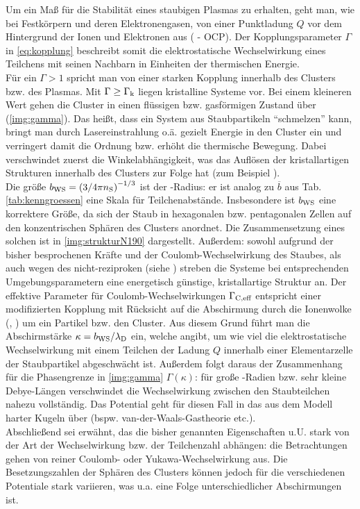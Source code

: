          Um ein Maß für die Stabilität eines staubigen Plasmas zu erhalten, geht man, wie bei Festkörpern und deren Elektronengasen, von einer Punktladung $Q$ vor dem Hintergrund der Ionen und Elektronen aus ( - OCP). Der Kopplungsparameter $\Gamma$ in \autoref{eq:kopplung} beschreibt somit die elektrostatische Wechselwirkung eines Teilchens mit seinen Nachbarn in Einheiten der thermischen Energie.\\
        Für ein $\Gamma>1$ spricht man von einer starken Kopplung innerhalb des Clusters bzw. des Plasmas. Mit $\Gamma\geq\Gamma_\text{k}$ liegen kristalline Systeme vor. Bei einem kleineren Wert gehen die Cluster in einen flüssigen bzw. gasförmigen Zustand über (\autoref{img:gamma}). Das heißt, dass ein System aus Staubpartikeln "`schmelzen"' kann, bringt man durch Lasereinstrahlung o.ä. gezielt Energie in den Cluster ein und verringert damit die Ordnung bzw. erhöht die thermische Bewegung. Dabei verschwindet zuerst die Winkelabhängigkeit, was das Auflösen der kristallartigen Strukturen innerhalb des Clusters zur Folge hat (zum Beispiel \cite{Thomas96}).\\
        Die größe $b_\text{WS}=\left(3/4\pi n_\text{S}\right)^{-1/3}$ ist der -Radius: er ist analog zu $\overline{b}$ aus Tab. \ref{tab:kenngroessen} eine Skala für Teilchenabstände. Insbesondere ist $b_\text{WS}$ eine korrektere Größe, da sich der Staub in hexagonalen bzw. pentagonalen Zellen auf den konzentrischen Sphären des Clusters anordnet. Die Zusammensetzung eines solchen  ist in \autoref{img:strukturN190} dargestellt. Außerdem: sowohl aufgrund der bisher besprochenen Kräfte und der Coulomb-Wechselwirkung des Staubes, als auch wegen des nicht-reziproken  (siehe \cite{Melzer95c}) streben die Systeme bei entsprechenden Umgebungsparametern eine energetisch günstige, kristallartige Struktur an.  Der effektive Parameter für Coulomb-Wechselwirkungen $\Gamma_\text{C,eff}$ entspricht einer modifizierten Kopplung mit Rücksicht auf die Abschirmung durch die Ionenwolke (\cite{Lampe00}, \cite{Schweigert00d}) um ein Partikel bzw. den Cluster. Aus diesem Grund führt man die Abschirmstärke $\kappa=b_\text{WS}/\lambda_\text{D}$ ein, welche angibt, um wie viel die elektrostatische Wechselwirkung mit einem Teilchen der Ladung $Q$ innerhalb einer Elementarzelle der Staubpartikel abgeschwächt ist. Außerdem folgt daraus der Zusammenhang für die Phasengrenze in \autoref{img:gamma} $\Gamma\left(\kappa\right)$: für große -Radien bzw. sehr kleine Debye-Längen verschwindet die Wechselwirkung zwischen den Staubteilchen nahezu vollständig. Das Potential geht für diesen Fall in das aus dem Modell harter Kugeln über (bspw. van-der-Waals-Gastheorie etc.).\\
        Abschließend sei erwähnt, das die bisher genannten Eigenschaften u.U. stark von der Art der Wechselwirkung bzw. der Teilchenzahl abhängen: die Betrachtungen gehen von reiner Coulomb- oder Yukawa-Wechselwirkung aus. Die Besetzungszahlen der Sphären des Clusters können jedoch für die verschiedenen Potentiale stark variieren, was u.a. eine Folge unterschiedlicher Abschirmungen ist.

